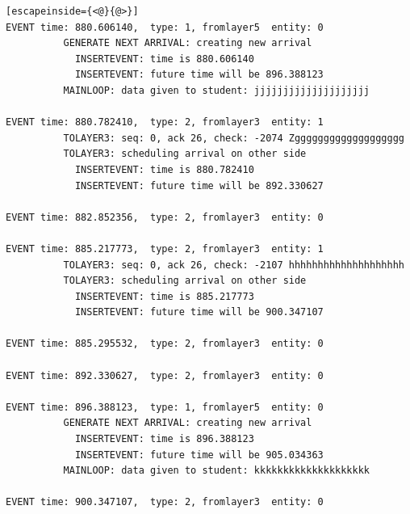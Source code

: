 \documentclass[paper=a4, fontsize=11pt]{scrartcl}
\numberwithin{equation}{section}		%
\numberwithin{figure}{section}			%
\numberwithin{table}{section}				%
\begin{document}
\begin{lstlisting}[escapeinside={<@}{@>}]
EVENT time: 880.606140,  type: 1, fromlayer5  entity: 0
          GENERATE NEXT ARRIVAL: creating new arrival
            INSERTEVENT: time is 880.606140
            INSERTEVENT: future time will be 896.388123
          MAINLOOP: data given to student: jjjjjjjjjjjjjjjjjjjj

EVENT time: 880.782410,  type: 2, fromlayer3  entity: 1
          TOLAYER3: seq: 0, ack 26, check: -2074 Zggggggggggggggggggg
          TOLAYER3: scheduling arrival on other side
            INSERTEVENT: time is 880.782410
            INSERTEVENT: future time will be 892.330627

EVENT time: 882.852356,  type: 2, fromlayer3  entity: 0

EVENT time: 885.217773,  type: 2, fromlayer3  entity: 1
          TOLAYER3: seq: 0, ack 26, check: -2107 hhhhhhhhhhhhhhhhhhhh
          TOLAYER3: scheduling arrival on other side
            INSERTEVENT: time is 885.217773
            INSERTEVENT: future time will be 900.347107

EVENT time: 885.295532,  type: 2, fromlayer3  entity: 0

EVENT time: 892.330627,  type: 2, fromlayer3  entity: 0

EVENT time: 896.388123,  type: 1, fromlayer5  entity: 0
          GENERATE NEXT ARRIVAL: creating new arrival
            INSERTEVENT: time is 896.388123
            INSERTEVENT: future time will be 905.034363
          MAINLOOP: data given to student: kkkkkkkkkkkkkkkkkkkk

EVENT time: 900.347107,  type: 2, fromlayer3  entity: 0


\end{lstlisting}
\end{document}
